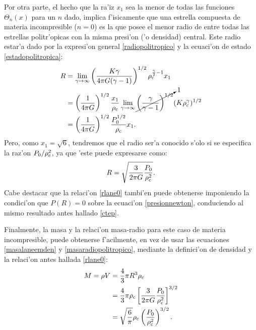 \begin{itemize}
Por otra parte, el hecho que la ra'iz $x_1$ sea la menor de todas las funciones $\Theta_n(x)$ para un $n$ dado, implica f'isicamente que una estrella compuesta de materia incompresible ($n=0$) es la que posee el menor radio de entre todas las estrellas politr'opicas con la misma presi'on ('o densidad) central. Este radio estar'a dado por la expresi'on general \eqref{radiopolitropico} y la ecuaci'on de estado \eqref{estadopolitropica}:
\begin{align}
 R&=\lim_{\gamma\to\infty}\left(\frac{K\gamma}{4\pi G(\gamma-1)}\right)^{1/2}\rho_{\rm c}^{\frac{\gamma}{2}-1}x_1\\
 &=\left(\frac{1}{4\pi G}\right)^{1/2}\frac{x_1}{\rho_{\rm c}}\lim_{\gamma\to\infty}\cancelto{1}{\left(\frac{\gamma}{\gamma-1}\right)^{1/2}}(K\rho_{\rm c}^\gamma)^{1/2}\\
 &=\left(\frac{1}{4\pi G}\right)^{1/2}\frac{P_0^{1/2}}{\rho_{\rm c}}x_1.
\end{align}
Pero, como $x_1=\sqrt{6}$, tendremos que el radio ser'a conocido s'olo si se especifica la raz'on $P_0/\rho_{\rm c}^2$, ya que 'este puede expresarse como:
\begin{equation}\label{rlane0}
 R=\sqrt{\frac{3}{2\pi G}\frac{P_0}{\rho_{\rm c}^2}}.
\end{equation}
Cabe destacar que la relaci'on \eqref{rlane0} tambi'en puede obtenerse imponiendo la condici'on que $P(R)=0$ sobre la ecuaci'on \eqref{presionnewton}, conduciendo al mismo resultado antes hallado \eqref{ctep}.

Finalmente, la masa y la relaci'on masa-radio para este caso de materia incompresible, puede obtenerse f'acilmente, en vez de usar las ecuaciones \eqref{masalaneemden} y \eqref{masaradiopolitropico}, mediante la definici'on de densidad y la relaci'on antes hallada \eqref{rlane0}:
\begin{align}
 M=\rho V&=\frac{4}{3}\pi R^3 \rho_{\rm c}\\
 &=\frac{4}{3}\pi\rho_{\rm c} \left[\frac{3}{2\pi G}\frac{P_0}{\rho_{\rm c}^2}\right]^{3/2}\\
 &=\sqrt{\frac{6}{\pi}}\rho_{\rm c} \left(\frac{P_0}{\rho_{\rm c}^2}\right)^{3/2}.
\end{align}



\end{itemize}
